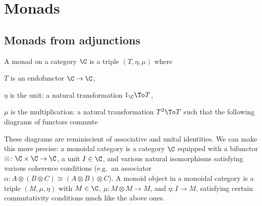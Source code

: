 \section{Monads}

\subsection{Monads from adjunctions}

\bdefn

    A {\emphcolor monad} on a category $\C$ is a triple $(T,\eta,\mu)$ where
    \benum
        \item $T$ is an endofunctor $\C\to\C$,
        \item $\eta$ is the {\emphcolor unit}: a natural transformation $1_\C\To T$,
        \item $\mu$ is the {\emphcolor multiplication}: a natural transformation $T^2\To T$
    \eenum
    such that the following diagrams of functors commute

    \centerline{\hfil{}}

\edefn

These diagrams are reminiscient of associative and unital identities.
We can make this more precise: a {\emphcolor monoidal category} is a category $\C$ equipped with a bifunctor $\otimes\colon\C\times\C\to\C$, a {\emphcolor unit} $I\in\C$,
and various natural isomorphisms satisfying various coherence conditions (e.g.\ an associator $\alpha\colon A\otimes(B\otimes C)\cong(A\otimes B)\otimes C$).
A {\emphcolor monoid object} in a monoidal category is a triple $(M,\mu,\eta)$ with $M\in\C$, $\mu\colon M\otimes M\to M$, and $\eta\colon I\to M$, satisfying
certain commutativity conditions much like the above ones.

